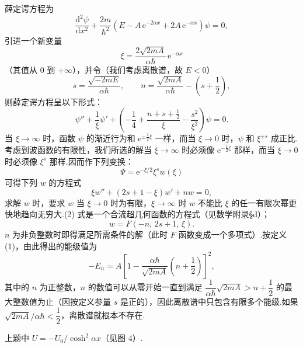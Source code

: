 \begin{xiti}
薛定谔方程为
\begin{equation*}
  \frac{\mathrm{d}^2\psi}{\mathrm{d}x^2}
  +\frac{2m}{\hbar^2}
  \left(E-A\,\mathrm{e}^{-2\alpha x}
  +2A\,\mathrm{e}^{-\alpha x}\right)\psi=0,
\end{equation*}
引进一个新变量
\begin{equation*}
  \xi=\frac{2\sqrt{2mA}}{\alpha\hbar}\,\mathrm{e}^{-\alpha x}
\end{equation*}
（其值从 0 到 $+\infty$），并令（我们考虑离散谱，故 $E<0$）
\begin{equation*}
  s=\frac{\sqrt{-2mE}}{\alpha\hbar},
  \qquad
  n=\frac{\sqrt{2mA}}{\alpha\hbar}-\left(s+\frac{1}{2}\right),
\end{equation*}
则薛定谔方程呈以下形式：
\begin{equation*}
  \psi''+\frac{1}{\xi}\psi'
  +\left(-\frac{1}{4}
  +\frac{n+s+\frac{1}{2}}{\xi}
  -\frac{s^2}{\xi^2}\right)\psi=0.
\end{equation*}
当 $\xi\to\infty$ 时，函数 $\psi$ 的渐近行为和 $\mathrm{e}^{\pm\frac{1}{2}\xi}$ 一样，而当 $\xi\to 0$ 时，$\psi$ 和 $\xi^{\pm s}$ 成正比.考虑到波函数的有限性，我们所选的解当 $\xi\to\infty$ 时必须像 $\mathrm{e}^{-\frac{1}{2}\xi}$ 那样，而当 $\xi\to 0$ 时必须像 $\xi^s$ 那样.因而作下列变换：
\begin{equation*}
  \varPsi=\mathrm{e}^{-\xi/2}\xi^s w(\xi)
\end{equation*}
可得下列 $w$ 的方程式
\begin{equation*}
  \xi w''+\left(2s+1-\xi\right)w'+nw=0,
\end{equation*}
求解 $w$ 时，要求 $w$ 当 $\xi\to 0$ 时为有限，$\xi\to\infty$ 时 $w$ 不能比 $\xi$ 的任一有限次幂更快地趋向无穷大.(2) 式是一个合流超几何函数的方程式（见数学附录§d）；
\begin{equation*}
  w=F\left(-n,\,2s+1,\,\xi\right).
\end{equation*}
$n$ 为非负整数时即得满足所需条件的解（此时 $F$ 函数变成一个多项式）.按定义 (1)，由此得出的能级值为
\begin{equation*}
  -E_n=A\left[1-\frac{\alpha\hbar}{\sqrt{2mA}}
  \left(n+\frac{1}{2}\right)\right]^2,
\end{equation*}
其中的 $n$ 为正整数，$n$ 的数值可以从零开始一直到满足
$\dfrac{1}{\alpha\hbar}\sqrt{2mA}>n+\dfrac{1}{2}$
的最大整数值为止（因按定义参量 $s$ 是正的），因此离散谱中只包含有限多个能级.如果 $\sqrt{2mA}/\alpha\hbar<\dfrac{1}{2}$，离散谱就根本不存在.

\quad 上题中 $U=-U_0/\cosh^2\alpha x$（见图 4）.


\end{xiti}

